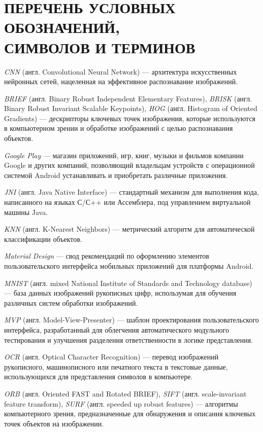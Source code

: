 \section*{%
  ПЕРЕЧЕНЬ УСЛОВНЫХ ОБОЗНАЧЕНИЙ, \\
  СИМВОЛОВ  И ТЕРМИНОВ}

\textit{CNN} (англ. Convolutional Neural Network) ---
архитектура искусственных нейронных сетей,
нацеленная на эффективное распознавание изображений.

\textit{BRIEF} (англ. Binary Robust Independent Elementary Features),
\textit{BRISK} (англ. Binary Robust Invariant Scalable Keypoints),
\textit{HOG} (англ. Histogram of Oriented Gradients) ---
дескрипторы ключевых точек
изображения, которые используются в компьютерном зрении и обработке изображений
с целью распознавания объектов.

\textit{Google Play} ---
магазин приложений, игр, книг, музыки и фильмов компании Google и других компаний,
позволяющий владельцам устройств с операционной системой Android устанавливать
и приобретать различные приложения.

\textit{JNI} (англ. Java Native Interface) ---
стандартный механизм для выполнения кода, написанного на языках С/С++ или Ассемблера,
под управлением виртуальной машины Java.

\textit{KNN} (англ. K-Nearest Neighbors) ---
метрический алгоритм для автоматической классификации объектов.

\textit{Material Design} ---
свод рекомендаций по оформлению элементов пользовательского интерфейса
мобильных приложений для платформы Android.

\textit{MNIST} (англ. mixed National Institute of Standards and Technology database) ---
база данных изображений рукописных цифр, использумая для обучения
различных систем обработки изображений.

\textit{MVP} (англ. Model-View-Presenter) ---
шаблон проектирования пользовательского интерфейса, разработанный для облегчения
автоматического модульного тестирования и улучшения разделения ответственности
в логике представления.

\textit{OCR} (англ. Optical Character Recognition) ---
перевод изображений рукописного, машинописного или печатного текста в текстовые
данные, использующихся для представления символов в компьютере.

\textit{ORB} (англ. Oriented FAST and Rotated BRIEF),
\textit{SIFT} (англ. scale-invariant feature transform),
\textit{SURF} (англ. speeded up robust features) ---
алгоритмы компьютерного зрения,
предназначенные для обнаружения и описания ключевых точек объектов на изображении.

